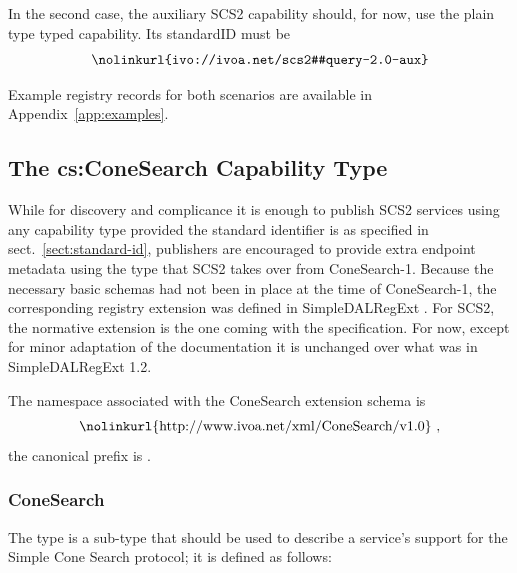 \documentclass[11pt,a4paper]{ivoa}
\begin{document}
In the second case, the auxiliary SCS2 capability should, for now, use
the plain type  typed capability.  Its standardID
must be
$$
\hbox{\nolinkurl{ivo://ivoa.net/scs2#query-2.0-aux}}
$$

Example registry records for both scenarios are available in
Appendix~\ref{app:examples}.


\subsection{The cs:ConeSearch Capability Type}

While for discovery and complicance it is enough to publish SCS2
services using any capability type provided the standard identifier is
as specified in sect.~\ref{sect:standard-id}, publishers are encouraged
to provide extra endpoint metadata using the  type
that SCS2 takes over from ConeSearch-1.  Because the necessary
basic schemas had not been in place at the time of ConeSearch-1, the
corresponding registry extension was defined in SimpleDALRegExt
\citep{2022ivoa.spec.0222D}.  For SCS2, the normative extension is the
one coming with the specification.  For now, except for minor adaptation
of the documentation it is unchanged over what
was in SimpleDALRegExt 1.2.

The namespace associated with the ConeSearch extension schema is
$$\hbox{\nolinkurl{http://www.ivoa.net/xml/ConeSearch/v1.0} ,}$$
the canonical prefix is .

\subsubsection{ConeSearch}

   The  type is a  sub-type that should be used
   to describe a service's support for the Simple Cone Search protocol;
   it is defined as follows:
\end{document}
